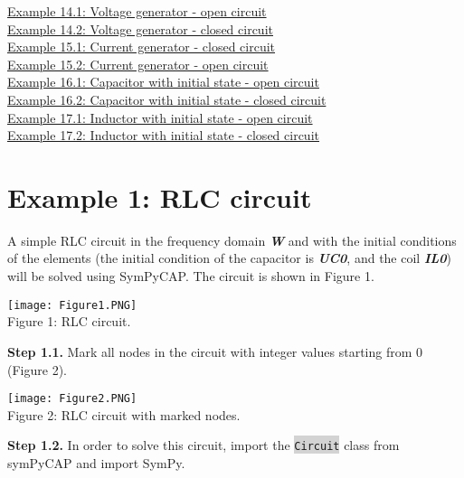 \documentclass[11pt]{article}
\begin{document}
\hyperref[example141]{Example 14.1: Voltage generator - open circuit}\\
\hyperref[example142]{Example 14.2: Voltage generator - closed circuit}\\
\hyperref[example151]{Example 15.1: Current generator - closed circuit}\\
\hyperref[example151]{Example 15.2: Current generator - open circuit}\\
\hyperref[example161]{Example 16.1: Capacitor with initial state - open circuit}\\
\hyperref[example162]{Example 16.2: Capacitor with initial state - closed circuit}\\
\hyperref[example171]{Example 17.1: Inductor with initial state - open circuit}\\
\hyperref[example172]{Example 17.2: Inductor with initial state - closed circuit}\\

    \hypertarget{example-1-rlc-circuit}{%
\section*{\texorpdfstring{Example 1: RLC circuit
}{Example 1: RLC circuit }}\label{example1}}

A simple RLC circuit in the frequency domain \textit{\textbf{W}} and with the initial
conditions of the elements (the initial condition of the capacitor is \textit{\textbf{UC0}},
and the coil \textit{\textbf{IL0}}) will be solved using SymPyCAP. The circuit is
shown in Figure 1.\\
    
   \begin{center}
   \texttt{[image: Figure1.PNG]}\\
       Figure 1: RLC circuit.
   \end{center} 

    \textbf{Step 1.1.} Mark all nodes in the circuit with integer values
starting from 0 (Figure 2). \\

    \begin{center}
   \texttt{[image: Figure2.PNG]}\\
       Figure 2: RLC circuit with marked nodes.
   \end{center} 

    

    \textbf{Step 1.2.} In order to solve this circuit, import the
{\setlength{\fboxsep}{2pt}\colorbox{LightGray}{\texttt{Circuit}}} class from symPyCAP and import SymPy.
\end{document}
